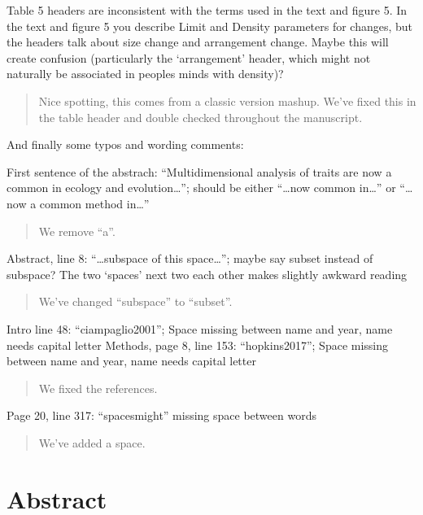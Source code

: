 \documentclass[]{article}
\begin{document}
Table 5 headers are inconsistent with the terms used in the text and
figure 5. In the text and figure 5 you describe Limit and Density
parameters for changes, but the headers talk about size change and
arrangement change. Maybe this will create confusion (particularly the
`arrangement' header, which might not naturally be associated in peoples
minds with density)?

\begin{quote}
Nice spotting, this comes from a classic version mashup. We've fixed
this in the table header and double checked throughout the manuscript.
\end{quote}

And finally some typos and wording comments:

First sentence of the abstrach: ``Multidimensional analysis of traits
are now a common in ecology and evolution\ldots{}''; should be either
``\ldots{}now common in\ldots{}'' or ``\ldots{}now a common method
in\ldots{}''

\begin{quote}
We remove ``a''.
\end{quote}

Abstract, line 8: ``\ldots{}subspace of this space\ldots{}''; maybe say
subset instead of subspace? The two `spaces' next two each other makes
slightly awkward reading

\begin{quote}
We've changed ``subspace'' to ``subset''.
\end{quote}

Intro line 48: ``ciampaglio2001''; Space missing between name and year,
name needs capital letter Methods, page 8, line 153: ``hopkins2017'';
Space missing between name and year, name needs capital letter

\begin{quote}
We fixed the references.
\end{quote}

Page 20, line 317: ``spacesmight'' missing space between words

\begin{quote}
We've added a space.
\end{quote}

\modulolinenumbers[1] %
\linenumbers

\section{Abstract}\label{abstract}
\end{document}
